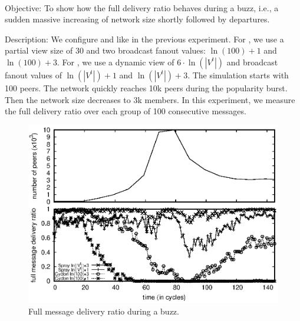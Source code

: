 \ \\

\begin{asparadesc}
\item [Objective:] To show how the full delivery ratio behaves during a buzz,
  i.e., a sudden massive increasing of network size shortly followed by
  departures.
\item [Description:] We configure \SPRAY and \CYCLON like in the
  previous experiment. For \CYCLON, we use a partial view size of 30
  and two broadcast fanout values: $\ln(100)+1$ and $\ln(100)+3$. For
  \SPRAY, we use a dynamic view of $6 \cdot \ln(|V^t|)$ and broadcast
  fanout values of $\ln(|V^t|)+1$ and $\ln(|V^t|)+3$. The simulation
  starts with 100 peers. The network quickly reaches 10k peers during
  the popularity burst. Then the network size decreases to 3k
  members. In this experiment, we measure the full delivery ratio over
  each group of 100 consecutive messages.

\begin{figure}
  \begin{center}
    \includegraphics[width=\SCALE\textwidth]{img/peak.eps}
    \caption{\label{fig:peak}Full message delivery ratio during a buzz.}
  \end{center}
\end{figure}


\end{asparadesc}

